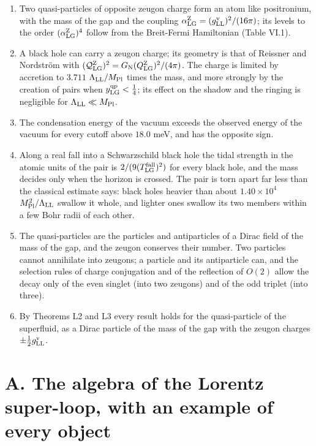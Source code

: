 \documentclass[
  10pt,
]{article}
\providecommand{\tightlist}{%
  \setlength{\itemsep}{0pt}\setlength{\parskip}{0pt}}
\begin{document}
\begin{enumerate}
\def\labelenumi{\arabic{enumi}.}
\tightlist
\item
  Two quasi-particles of opposite zeugon charge form an atom like
  positronium, with the mass of the gap and the coupling
  \(\alpha^{\rm Z}_{\rm LG}=(g^{\rm v}_{\rm LL})^2/(16\pi)\); its levels
  to the order \((\alpha^{\rm Z}_{\rm LG})^4\) follow from the
  Breit-Fermi Hamiltonian (Table VI.1).
\item
  A black hole can carry a zeugon charge; its geometry is that of
  Reissner and Nordström with
  \((\mathcal Q^{\rm Z}_{\rm LG})^2=G_{\rm N}(Q^{\rm Z}_{\rm LG})^2/(4\pi)\).
  The charge is limited by accretion to \(3.711\)
  \(\Lambda_{\rm LL}/M_{\rm Pl}\) times the mass, and more strongly by
  the creation of pairs when \(y^{\rm qp}_{\rm LG}<\tfrac14\); its
  effect on the shadow and the ringing is negligible for
  \(\Lambda_{\rm LL}\ll M_{\rm Pl}\).
\item
  The condensation energy of the vacuum exceeds the observed energy of
  the vacuum for every cutoff above \(18.0\) meV, and has the opposite
  sign.
\item
  Along a real fall into a Schwarzschild black hole the tidal strength
  in the atomic units of the pair is \(2/(9(T^{\rm fall}_{\rm LG})^2)\)
  for every black hole, and the mass decides only when the horizon is
  crossed. The pair is torn apart far less than the classical estimate
  says: black holes heavier than about \(1.40\times10^{4}\)
  \(M_{\rm Pl}^2/\Lambda_{\rm LL}\) swallow it whole, and lighter ones
  swallow its two members within a few Bohr radii of each other.
\item
  The quasi-particles are the particles and antiparticles of a Dirac
  field of the mass of the gap, and the zeugon conserves their number.
  Two particles cannot annihilate into zeugons; a particle and its
  antiparticle can, and the selection rules of charge conjugation and of
  the reflection of \(O(2)\) allow the decay only of the even singlet
  (into two zeugons) and of the odd triplet (into three).
\item
  By Theorems L2 and L3 every result holds for the quasi-particle of the
  superfluid, as a Dirac particle of the mass of the gap with the zeugon
  charges \(\pm\tfrac12g^{\rm v}_{\rm LL}\).
\end{enumerate}

\hypertarget{a.-the-algebra-of-the-lorentz-super-loop-with-an-example-of-every-object}{%
\section{A. The algebra of the Lorentz super-loop, with an example of
every
object}\label{a.-the-algebra-of-the-lorentz-super-loop-with-an-example-of-every-object}}
\end{document}

